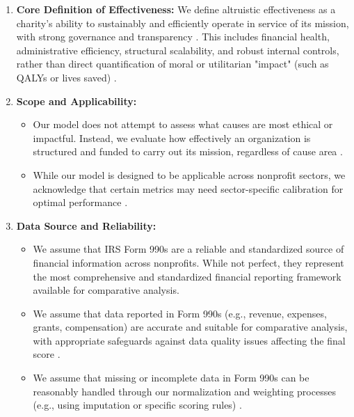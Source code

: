 \documentclass[12pt]{article}
\begin{document}
\begin{enumerate}[label=\arabic*.]
    \item \textbf{Core Definition of Effectiveness:} We define altruistic effectiveness as a charity's ability to sustainably and efficiently operate in service of its mission, with strong governance and transparency \cite{https://doi.org/10.1002/nml.21143}. This includes financial health, administrative efficiency, structural scalability, and robust internal controls, rather than direct quantification of moral or utilitarian "impact" (such as QALYs or lives saved) \cite{bowman2011}.

    \item \textbf{Scope and Applicability:}
        \begin{itemize}[label=\textbullet]
            \item Our model does not attempt to assess what causes are most ethical or impactful. Instead, we evaluate how effectively an organization is structured and funded to carry out its mission, regardless of cause area \cite{lecy_nonprofit_2012}.
            \item While our model is designed to be applicable across nonprofit sectors, we acknowledge that certain metrics may need sector-specific calibration for optimal performance \cite{bowman2011}.
        \end{itemize}

    \item \textbf{Data Source and Reliability:}
        \begin{itemize}[label=\textbullet]
            \item We assume that IRS Form 990s are a reliable and standardized source of financial information across nonprofits. While not perfect, they represent the most comprehensive and standardized financial reporting framework available for comparative analysis.
            \item We assume that data reported in Form 990s (e.g., revenue, expenses, grants, compensation) are accurate and suitable for comparative analysis, with appropriate safeguards against data quality issues affecting the final score \cite{article}.
            \item We assume that missing or incomplete data in Form 990s can be reasonably handled through our normalization and weighting processes (e.g., using imputation or specific scoring rules) \cite{TRUSSEL2007263}.
        \end{itemize}


\end{enumerate}
\end{document}
